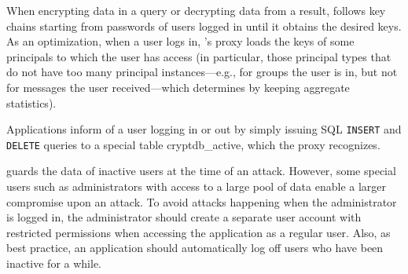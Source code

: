 When encrypting data in a query or decrypting data from a result,
\name{} follows key chains starting from passwords of users logged in
until it obtains the desired keys. As an optimization, when a user
logs in, \name{}'s proxy loads the keys of some principals to which
the user has access (in particular, those principal types that do not
have too many principal instances---e.g., for groups the user is in,
but not for messages the user received---which \name determines by
keeping aggregate statistics).

Applications inform \name{} of a user logging in or out by simply
issuing SQL {\tt INSERT} and {\tt DELETE} queries to a special table
\textsf{cryptdb\_active}, which the proxy recognizes.

\name{} guards the data of inactive users at the time of an
attack. However, some special users such as administrators with access
to a large pool of data enable a larger compromise upon an attack.  To
avoid attacks happening when the administrator is logged in, the
administrator should create a separate user account with restricted
permissions when accessing the application as a regular user. Also, as
best practice, an application should automatically log off users who
have been inactive for a while.










